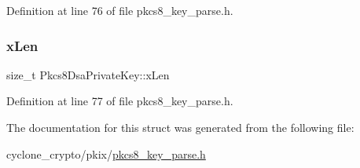 Definition at line 76 of file pkcs8\+\_\+key\+\_\+parse.\+h.

\mbox{\label{structPkcs8DsaPrivateKey_ae432d960efd869f6cda9c91fa0e0e408}} 
\subsubsection{\texorpdfstring{x\+Len}{xLen}}
{\footnotesize\ttfamily size\+\_\+t Pkcs8\+Dsa\+Private\+Key\+::x\+Len}



Definition at line 77 of file pkcs8\+\_\+key\+\_\+parse.\+h.



The documentation for this struct was generated from the following file\+:\begin{DoxyCompactItemize}
\item 
cyclone\+\_\+crypto/pkix/\hyperlink{pkcs8__key__parse_8h}{pkcs8\+\_\+key\+\_\+parse.\+h}\end{DoxyCompactItemize}
